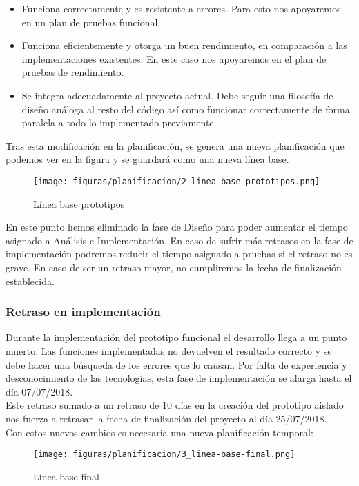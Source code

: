 \begin{itemize}
    \item Funciona correctamente y es resistente a errores. Para esto nos apoyaremos en un plan de pruebas funcional.
    \item Funciona eficientemente y otorga un buen rendimiento, en comparación a las implementaciones existentes. En este caso nos apoyaremos en el plan de pruebas de rendimiento.
    \item Se integra adecuadamente al proyecto actual. Debe seguir una filosofía de diseño análoga al resto del código así como funcionar correctamente de forma paralela a todo lo implementado previamente.
\end{itemize}

Tras esta modificación en la planificación, se genera una nueva planificación que podemos ver en la figura y se guardará como una nueva línea base.%

\begin{figure}[H]
    \centerline{\texttt{[image: figuras/planificacion/2\_linea-base-prototipos.png]}}
    \caption{Línea base prototipos}
\end{figure}

En este punto hemos eliminado la fase de Diseño para poder aumentar el tiempo asignado a Análisis e Implementación. En caso de sufrir más retrasos en la fase de implementación podremos reducir el tiempo asignado a pruebas si el retraso no es grave. En caso de ser un retraso mayor, no cumpliremos la fecha de finalización establecida.

\subsubsection{Retraso en implementación}

Durante la implementación del prototipo funcional el desarrollo llega a un punto muerto. Las funciones implementadas no devuelven el resultado correcto y se debe hacer una búsqueda de los errores que lo causan. Por falta de experiencia y desconocimiento de las tecnologías, esta fase de implementación se alarga hasta el día 07/07/2018. \\

Este retraso sumado a un retraso de 10 días en la creación del prototipo aislado nos fuerza a retrasar la fecha de finalización del proyecto al día 25/07/2018. \\

Con estos nuevos cambios es necesaria una nueva planificación temporal:

\begin{figure}[H]
    \centerline{\texttt{[image: figuras/planificacion/3\_linea-base-final.png]}}
    \caption{Línea base final}
\end{figure}

